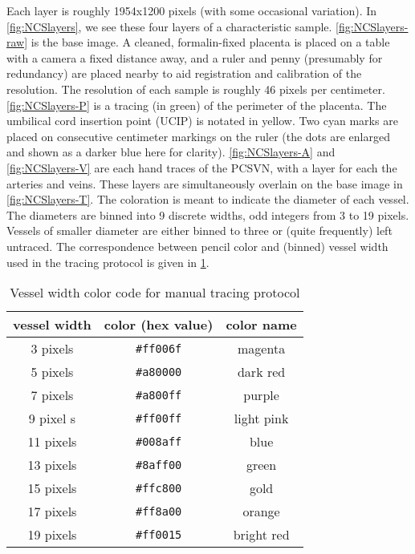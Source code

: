 Each layer is roughly 1954x1200 pixels (with some occasional variation).
In \cref{fig:NCSlayers}, we see these four layers of a characteristic sample. \cref{fig:NCSlayers-raw} is the base image. A cleaned, formalin-fixed placenta is placed on a table with a camera a fixed distance away, and a ruler and penny (presumably for redundancy) are placed nearby to aid registration and calibration of the resolution. The resolution of each sample is roughly 46 pixels per centimeter.
\cref{fig:NCSlayers-P} is a tracing (in green) of the perimeter of the placenta. The umbilical cord insertion point (UCIP) is notated in yellow. Two cyan marks are placed on consecutive centimeter markings on the ruler (the dots are enlarged and shown as a darker blue here for clarity).
\cref{fig:NCSlayers-A} and \cref{fig:NCSlayers-V} are each hand traces of the PCSVN, with a layer for each the arteries and veins. These layers are simultaneously overlain on the base image in \cref{fig:NCSlayers-T}. The coloration is meant to indicate the diameter of each vessel. The diameters are binned into 9 discrete widths, odd integers from 3 to 19 pixels. Vessels of smaller diameter are either binned to three or (quite frequently) left untraced. The correspondence between pencil color and (binned) vessel width used in the tracing protocol is given in \cref{tab:widthcolors}.

\begin{table}
    \centering
\begin{tabular}{ccc}
    \hline
    \rule[-1ex]{0pt}{2.5ex}
    vessel width & color (hex value) & color name \\
    \hline 
    \rule[-1ex]{0pt}{2.5ex}
    3 pixels &  \texttt{\#ff006f} &   magenta \\                                      
    \rule[-1ex]{0pt}{2.5ex}
    5 pixels & \texttt{\#a80000}  & dark red \\                                      
    \rule[-1ex]{0pt}{2.5ex}
    7 pixels &  \texttt{\#a800ff} & purple \\                                          
    \rule[-1ex]{0pt}{2.5ex}
    9 pixel s&  \texttt{\#ff00ff}  & light pink \\
    \rule[-1ex]{0pt}{2.5ex}
    11 pixels &  \texttt{\#008aff} & blue \\                                          
    \rule[-1ex]{0pt}{2.5ex}
    13 pixels &  \texttt{\#8aff00} &   green \\                                        
    \rule[-1ex]{0pt}{2.5ex}
    15 pixels &  \texttt{\#ffc800} &  gold \\                                    
    \rule[-1ex]{0pt}{2.5ex}
    17 pixels & \texttt{\#ff8a00}  &  orange \\                                         
    \rule[-1ex]{0pt}{2.5ex}
    19 pixels & \texttt{\#ff0015}   &  bright red  \\
    \hline
\end{tabular}
\caption{Vessel width color code for manual tracing protocol}
\label{tab:widthcolors}
\end{table}


